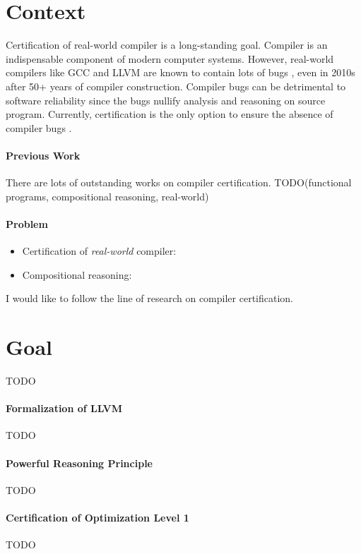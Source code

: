 \documentclass[nocopyrightspace]{sigplanconf}
\begin{document}
\section{Context}
Certification of real-world compiler is a long-standing goal.
Compiler is an indispensable component of modern computer systems.
However, real-world compilers like GCC and LLVM are known to contain
lots of bugs \cite{TODO}, even in 2010s after 50+ years of compiler
construction.  Compiler bugs can be detrimental to software
reliability since the bugs nullify analysis and reasoning on source
program.  Currently, certification is the only option to ensure the
absence of compiler bugs \cite{TODO}.

\paragraph{Previous Work}
There are lots of outstanding works on compiler certification.
TODO(functional programs, compositional reasoning, real-world)

\paragraph{Problem}

\begin{itemize}
\item Certification of \emph{real-world} compiler:
\item Compositional reasoning:
\end{itemize}
I would like to follow the line of research on compiler certification.

\section{Goal}
TODO

\paragraph{Formalization of LLVM}
TODO

\paragraph{Powerful Reasoning Principle}
TODO

\paragraph{Certification of Optimization Level 1}
TODO
\end{document}
